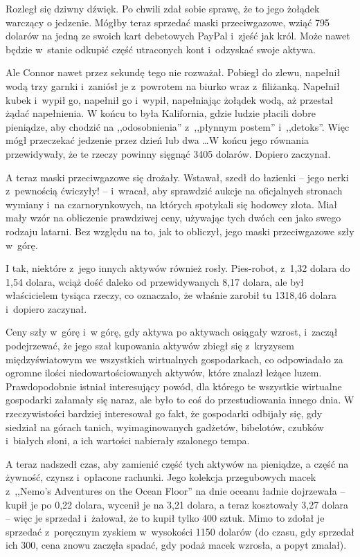 \documentclass[oneside,polish,11pt,rmheadings]{mwbk}
\begin{document}
Rozległ się dziwny dźwięk. Po chwili zdał sobie sprawę, że to jego żołądek warczący o jedzenie. Mógłby teraz sprzedać maski przeciwgazowe, wziąć 795 dolarów na jedną ze swoich kart debetowych PayPal i~zjeść jak król. Może nawet będzie w~stanie odkupić część utraconych kont i~odzyskać swoje aktywa.

Ale Connor nawet przez sekundę tego nie rozważał. Pobiegł do zlewu, napełnił wodą trzy garnki i~zaniósł je z~powrotem na biurko wraz z~filiżanką. Napełnił kubek i~wypił go, napełnił go i~wypił, napełniając żołądek wodą, aż przestał żądać napełnienia. W końcu to była Kalifornia, gdzie ludzie płacili dobre pieniądze, aby chodzić na ,,odosobnienia'' z~,,płynnym postem'' i~,,detoks''. Więc mógł przeczekać jedzenie przez dzień lub dwa \ldots  W końcu jego równania przewidywały, że te rzeczy powinny sięgnąć 3405 dolarów. Dopiero zaczynał.

A teraz maski przeciwgazowe się drożały. Wstawał, szedł do łazienki -- jego nerki z~pewnością ćwiczyły! -- i~wracał, aby sprawdzić aukcje na oficjalnych stronach wymiany i~na czarnorynkowych, na których spotykali się hodowcy złota. Miał mały wzór na obliczenie prawdziwej ceny, używając tych dwóch cen jako swego rodzaju latarni. Bez względu na to, jak to obliczył, jego maski przeciwgazowe szły w~górę.

I tak, niektóre z~jego innych aktywów również rosły. Pies-robot, z~1,32 dolara do 1,54 dolara, wciąż dość daleko od przewidywanych 8,17 dolara, ale był właścicielem tysiąca rzeczy, co oznaczało, że właśnie zarobił tu 1318,46 dolara i~dopiero zaczynał.

Ceny szły w~górę i~w górę, gdy aktywa po aktywach osiągały wzrost, i~zaczął podejrzewać, że jego szał kupowania aktywów zbiegł się z~kryzysem międzyświatowym we wszystkich wirtualnych gospodarkach, co odpowiadało za ogromne ilości niedowartościowanych aktywów, które znalazł leżące luzem. Prawdopodobnie istniał interesujący powód, dla którego te wszystkie wirtualne gospodarki załamały się naraz, ale było to coś do przestudiowania innego dnia. W rzeczywistości bardziej interesował go fakt, że gospodarki odbijały się, gdy siedział na górach tanich, wyimaginowanych gadżetów, bibelotów, czubków i~białych słoni, a ich wartości nabierały szalonego tempa.

A teraz nadszedł czas, aby zamienić część tych aktywów na pieniądze, a część na żywność, czynsz i~opłacone rachunki. Jego kolekcja przegubowych macek z~,,Nemo's Adventures on the Ocean Floor'' na dnie oceanu ładnie dojrzewała -- kupił je po 0,22 dolara, wycenił je na 3,21 dolara, a teraz kosztowały 3,27 dolara -- więc je sprzedał i~żałował, że to kupił tylko 400 sztuk. Mimo to zdołał je sprzedać z~poręcznym zyskiem w~wysokości 1150 dolarów (do czasu, gdy sprzedał ich 300, cena znowu zaczęła spadać, gdy podaż macek wzrosła, a popyt zmalał).
\end{document}
